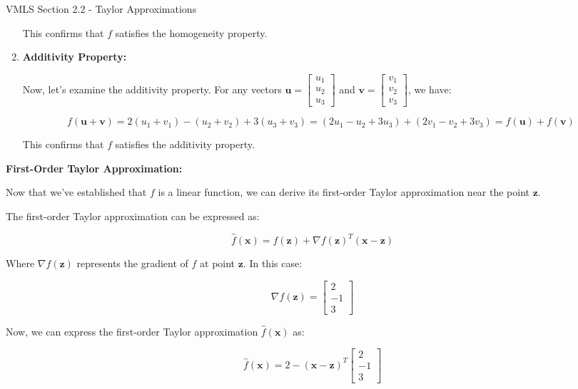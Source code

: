 \begin{notes}{VMLS Section 2.2 - Taylor Approximations}
\begin{Highlight}
\begin{enumerate}
            This confirms that \(f\) satisfies the homogeneity property.
            
            \item \textbf{Additivity Property:}
            
            Now, let's examine the additivity property. For any vectors \(\mathbf{u} = \begin{bmatrix} u_1 \\ u_2 \\ u_3 \end{bmatrix}\) and \(\mathbf{v} = \begin{bmatrix} v_1 \\ v_2 \\ v_3 \end{bmatrix}\), we have:
            
            \[f(\mathbf{u} + \mathbf{v}) = 2(u_1 + v_1) - (u_2 + v_2) + 3(u_3 + v_3) = (2u_1 - u_2 + 3u_3) + (2v_1 - v_2 + 3v_3) = f(\mathbf{u}) + f(\mathbf{v})\]
            
            This confirms that \(f\) satisfies the additivity property.
        \end{enumerate}
        
        \textbf{First-Order Taylor Approximation:} \vspace*{1em}
        
        Now that we've established that \(f\) is a linear function, we can derive its first-order Taylor approximation near the point \(\mathbf{z}\).
        
        The first-order Taylor approximation can be expressed as:
        
        \[\hat{f}(\mathbf{x}) = f(\mathbf{z}) + \nabla f(\mathbf{z})^T (\mathbf{x} - \mathbf{z})\]
        
        Where \(\nabla f(\mathbf{z})\) represents the gradient of \(f\) at point \(\mathbf{z}\). In this case:
        
        \[\nabla f(\mathbf{z}) = \begin{bmatrix} 2 \\ -1 \\ 3 \end{bmatrix}\]
        
        Now, we can express the first-order Taylor approximation \(\hat{f}(\mathbf{x})\) as:
        
        \[\hat{f}(\mathbf{x}) = 2 - (\mathbf{x} - \mathbf{z})^T \begin{bmatrix} 2 \\ -1 \\ 3 \end{bmatrix}\]
        

\end{Highlight}
\end{notes}
